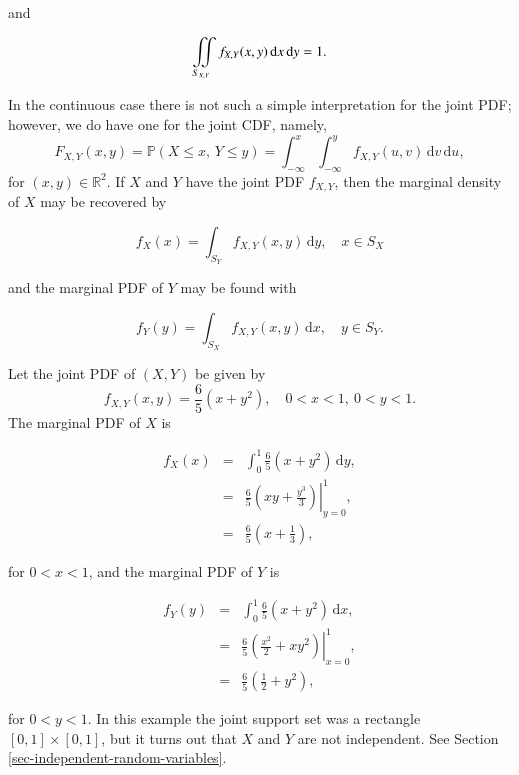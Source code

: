 \documentclass[]{book}
\numberwithin{equation}{chapter}
\numberwithin{figure}{chapter}
\theoremstyle{plain}
\theoremstyle{definition}
\theoremstyle{remark}
\theoremstyle{definition}
\theoremstyle{definition}
\theoremstyle{remark}
\let\BeginKnitrBlock\begin \let\EndKnitrBlock\end
\begin{document}
and

\begin{equation}
\iintop_{S_{X,Y}}f_{X,Y}(x,y)\,\mathrm{d} x\,\mathrm{d} y=1.
\end{equation}

In the continuous case there is not such a simple interpretation for the
joint PDF; however, we do have one for the joint CDF, namely, \[
F_{X,Y}(x,y)=\mathbb{P}(X\leq x,\, Y\leq
y)=\int_{-\infty}^{x}\int_{-\infty}^{y}f_{X,Y}(u,v)\,\mathrm{d}
v\,\mathrm{d} u, \] for \((x,y)\in\mathbb{R}^{2}\). If \(X\) and \(Y\)
have the joint PDF \(f_{X,Y}\), then the marginal density of \(X\) may
be recovered by

\begin{equation}
f_{X}(x)=\int_{S_{Y}}f_{X,Y}(x,y)\,\mathrm{d} y,\quad x \in S_{X}
\end{equation}

and the marginal PDF of \(Y\) may be found with

\begin{equation}
f_{Y}(y)=\int_{S_{X}}f_{X,Y}(x,y)\,\mathrm{d} x, \quad y \in S_{Y}.
\end{equation}

\bigskip

\BeginKnitrBlock{example}
\protect\hypertarget{ex:joint-pdf}{}{\label{ex:joint-pdf}}Let the joint PDF
of \((X,Y)\) be given by \[
f_{X,Y}(x,y)=\frac{6}{5}\left(x+y^{2}\right),\quad 0 < x < 1,\ 0 < y
< 1.  \] The marginal PDF of \(X\) is

\begin{eqnarray*}
f_{X}(x) & = & \int_{0}^{1}\frac{6}{5}\left(x+y^{2}\right)\,\mathrm{d} y,\\
 & = & \left.\frac{6}{5}\left(xy+\frac{y^{3}}{3}\right)\right|_{y=0}^{1},\\
 & = & \frac{6}{5}\left(x+\frac{1}{3}\right),
\end{eqnarray*}

for \(0 < x < 1\), and the marginal PDF of \(Y\) is

\begin{eqnarray*}
f_{Y}(y) & = & \int_{0}^{1}\frac{6}{5}\left(x+y^{2}\right)\,\mathrm{d} x,\\
 & = & \left.\frac{6}{5}\left(\frac{x^{2}}{2}+xy^{2}\right)\right|_{x=0}^{1},\\
 & = & \frac{6}{5}\left(\frac{1}{2}+y^{2}\right),
\end{eqnarray*}

for \(0 < y < 1\). In this example the joint support set was a rectangle
\([0,1]\times[0,1]\), but it turns out that \(X\) and \(Y\) are not
independent. See Section \ref{sec-independent-random-variables}.
\EndKnitrBlock{example}
\end{document}
